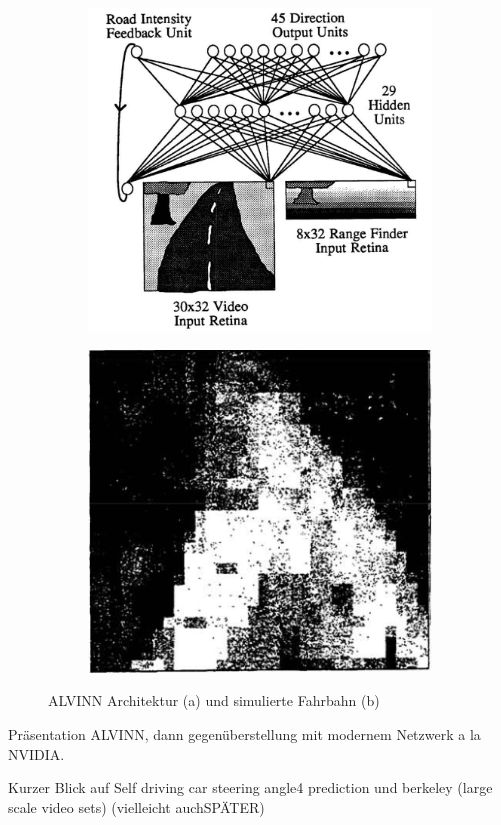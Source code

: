 \begin{figure}
	\centering
	\begin{subfigure}{.5\textwidth}
	\centering
		  \includegraphics[width=.85\linewidth]{figures/Architecture-ALVINN.png}
		  \caption{}
		  \label{img:ALVINNa}
	\end{subfigure}%
	\begin{subfigure}{.5\textwidth}
	\centering
		  \includegraphics[width=.85\linewidth]{figures/Strasse-ALVINN.png}
	 	  \caption{}
		  \label{img:ALVINNb}
	\end{subfigure}%
	\caption{ALVINN Architektur (a) und simulierte Fahrbahn (b)}
	\label{img:ALVINN}
\end{figure}



 Präsentation ALVINN, dann gegenüberstellung mit modernem Netzwerk a la NVIDIA.






Kurzer Blick auf  Self driving car steering angle4 prediction und berkeley (large scale video sets) (vielleicht auchSPÄTER)







